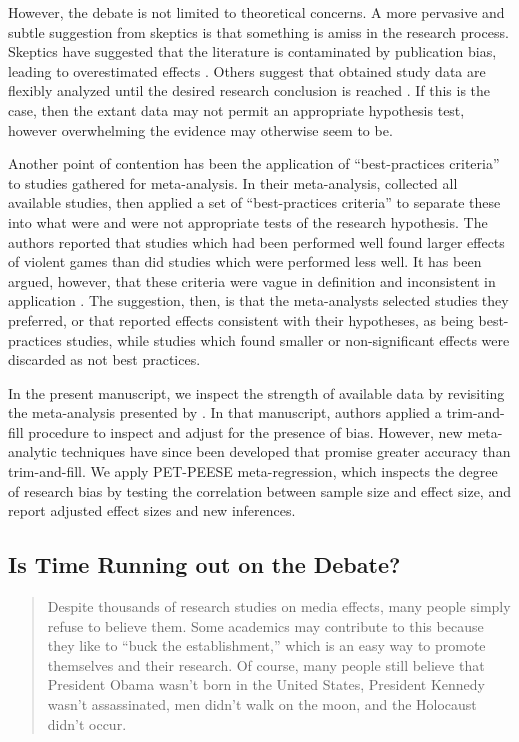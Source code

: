 \documentclass[man]{apa6}
\begin{document}
However, the debate is not limited to theoretical concerns. A more pervasive and subtle suggestion from skeptics is that something is amiss in the research process.  
Skeptics have suggested that the literature is contaminated by publication bias, leading to overestimated effects \citep{Ferguson:2007a}. 
Others suggest that obtained study data are flexibly analyzed until the desired research conclusion is reached \citep{Elson:etal:2014;Ferguson:CITATION:NEEDED}. If this is the case, then the extant data may not permit an appropriate hypothesis test, however overwhelming the evidence may otherwise seem to be. 

Another point of contention has been the application of ``best-practices criteria'' to studies gathered for meta-analysis. In their meta-analysis, \citet{Anderson:etal:2010} collected all available studies, then applied a set of ``best-practices criteria'' to separate these into what were and were not appropriate tests of the research hypothesis. The authors reported that studies which had been performed well found larger effects of violent games than did studies which were performed less well. It has been argued, however, that these criteria were vague in definition and inconsistent in application \citep{Elson?Ferguson?}. The suggestion, then, is that the meta-analysts selected studies they preferred, or that reported effects consistent with their hypotheses, as being best-practices studies, while studies which found smaller or non-significant effects were discarded as not best practices.

In the present manuscript, we inspect the strength of available data by revisiting the meta-analysis presented by \citet{Anderson:etal:2010}. In that manuscript, authors applied a trim-and-fill procedure \citep{Duval:Tweedie:2000} to inspect and adjust for the presence of bias. However, new meta-analytic techniques have since been developed that promise greater accuracy than trim-and-fill. We apply PET-PEESE meta-regression, which inspects the degree of research bias by testing the correlation between sample size and effect size, and report adjusted effect sizes and new inferences.

\subsection{Is Time Running out on the Debate?}
\begin{quote}
Despite thousands of research studies on media effects, many people simply refuse to believe them. Some academics may contribute to this because they like to ``buck the establishment,'' which is an easy way to promote themselves and their research. Of course, many people still believe that President Obama wasn't born in the United States, President Kennedy wasn't assassinated, men didn't walk on the moon, and the Holocaust didn't occur. \citep[p. 572]{Strasburger:etal:2014}
\end{quote}
\end{document}
